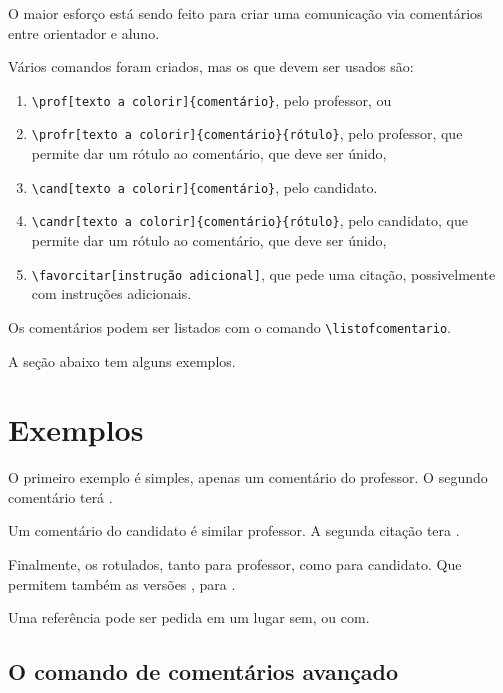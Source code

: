 \documentclass{article}
\begin{document}
O maior esforço está sendo feito para criar uma comunicação via comentários entre orientador e aluno. 

Vários comandos foram criados, mas os que devem ser usados são:
\begin{enumerate}
\item \verb!\prof[texto a colorir]{comentário}!, pelo professor, ou
\item \verb!\profr[texto a colorir]{comentário}{rótulo}!, pelo professor, que permite dar um rótulo ao comentário, que deve ser únido, 
\item \verb!\cand[texto a colorir]{comentário}!, pelo candidato.
\item \verb!\candr[texto a colorir]{comentário}{rótulo}!, pelo candidato, que permite dar um rótulo ao comentário, que deve ser únido, 
\item \verb!\favorcitar[instrução adicional]!, que pede uma citação, possivelmente com instruções adicionais.
\end{enumerate}

Os comentários podem ser listados com o comando \verb!\listofcomentario!.

A seção abaixo tem alguns exemplos.

\section{Exemplos}

O primeiro exemplo é simples, apenas um comentário do professor. O segundo comentário terá .

Um comentário do candidato é similar professor. A segunda citação tera .

Finalmente, os rotulados, tanto para professor, como para candidato. Que permitem também as versões , para .

Uma referência pode ser pedida em um lugar sem\favorcitar, ou com\favorcitar[o experimento].

\subsection{O comando de comentários avançado}
\end{document}

